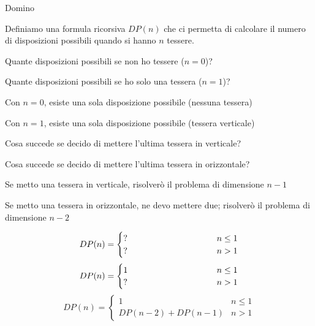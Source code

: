 \begin{frame}{Domino}

\vspace{-9pt}
\begin{myboxtitle}
Definiamo una formula ricorsiva $DP(n)$ che ci permetta di calcolare il numero di disposizioni possibili quando si hanno $n$ tessere.
\end{myboxtitle}

\begin{overprint}
\BIL
\item Quante disposizioni possibili se non ho tessere ($n=0$)?
\item Quante disposizioni possibili se ho solo una tessera ($n=1$)?
\EIL
{}
\BIL
\item Con $n=0$, esiste una sola disposizione possibile (nessuna tessera)
\item Con $n=1$, esiste una sola disposizione possibile (tessera verticale)
\EIL
{}
\BIL
\item Cosa succede se decido di mettere l'ultima tessera in verticale?
\item Cosa succede se decido di mettere l'ultima tessera in orizzontale?
\EI
{}
\BIL
\item Se metto una tessera in verticale, risolverò il problema
di dimensione $n-1$
\item Se metto una tessera in orizzontale, ne devo mettere due; risolverò
il problema di dimensione $n-2$
\EIL
\end{overprint}

\bigskip
\begin{overprint}
\[
DP(n) = \begin{cases}
  ? & n \leq 1 \\
  \makebox[3.5cm][l]{?} & n>1
\end{cases}
\]
\[
DP(n) = \begin{cases}
  1 & n \leq 1 \\
  \makebox[3.5cm][l]{?} & n>1
\end{cases}
\]
\[
DP(n) = \begin{cases}
  1 & n \leq 1 \\
  DP(n-2)+DP(n-1) & n>1
\end{cases}
\]
\end{overprint}

\end{frame}

